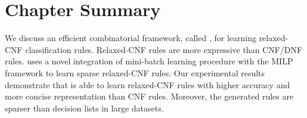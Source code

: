 \section{Chapter Summary}
\label{interpretability_crr_sec:conclusion}

We discuss an efficient combinatorial framework, called {\crr}, for learning relaxed-CNF  classification rules. Relaxed-CNF rules are  more expressive  than CNF/DNF rules.  {\crr}  uses a novel integration of mini-batch learning procedure with the MILP framework to learn sparse relaxed-CNF rules. Our experimental results demonstrate that {\crr} is able to learn relaxed-CNF  rules with higher accuracy and more concise representation than CNF rules. Moreover, the generated rules are sparser than decision lists in large datasets. 